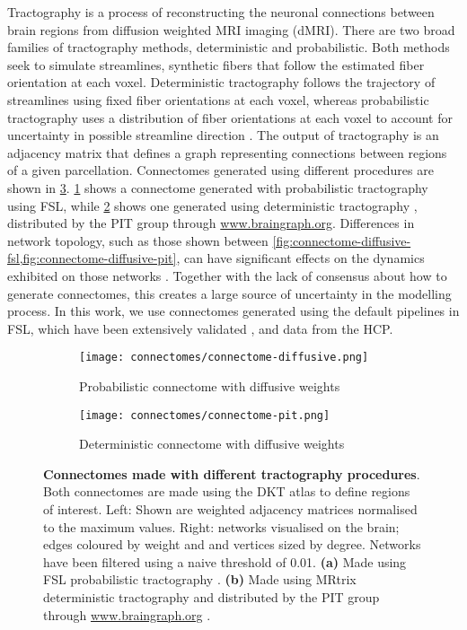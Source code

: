 Tractography is a process of reconstructing the neuronal connections between
brain regions from diffusion weighted MRI imaging (dMRI). There are two broad
families of tractography methods, deterministic and probabilistic. Both methods
seek to simulate streamlines, synthetic fibers that follow the estimated fiber
orientation at each voxel. Deterministic tractography follows the trajectory of
streamlines using fixed fiber orientations at each voxel, whereas probabilistic
tractography uses a distribution of fiber orientations at each voxel to account
for uncertainty in possible streamline direction \cite{sarwar2019mapping}. The
output of tractography is an adjacency matrix that defines a graph representing
connections between regions of a given parcellation. Connectomes generated using
different procedures are shown in \cref{fig:connectome}.
\cref{fig:connectome-diffusive-fsl} shows a connectome generated with
probabilistic tractography using FSL, while \cref{fig:connectome-diffusive-pit}
shows one generated using deterministic tractography
\cite{szalkai2017parameterizable,kerepesi2017braingraph}, distributed by the PIT
group through \url{www.braingraph.org}. Differences in network topology, such as
those shown between
\cref{fig:connectome-diffusive-fsl,fig:connectome-diffusive-pit}, can have
significant effects on the dynamics exhibited on those networks
\cite{putra2021braiding}. Together with the lack of consensus about how to
generate connectomes, this creates a large source of uncertainty in the
modelling process. In this work, we use connectomes generated using the default
pipelines in FSL, which have been extensively validated
\cite{behrens2003characterization,behrens2007probabilistic,warrington2020xtract},
and data from the HCP.
\begin{figure}[t]
    \centering
    \begin{subfigure}[b]{0.8\textwidth}
        \centering
        \texttt{[image: connectomes/connectome-diffusive.png]}
        \caption{Probabilistic connectome with diffusive weights}
        \label{fig:connectome-diffusive-fsl}
    \end{subfigure}
    \begin{subfigure}[b]{0.8\textwidth}
        \centering
        \texttt{[image: connectomes/connectome-pit.png]}
        \caption{Deterministic connectome with diffusive weights}
        \label{fig:connectome-diffusive-pit}
    \end{subfigure}
    \caption{\textbf{Connectomes made with different tractography procedures}.\\
    Both connectomes are made using the DKT atlas to define regions of interest.
    Left: Shown are weighted adjacency matrices normalised to the maximum
    values. Right: networks visualised on the brain; edges coloured by weight
    and and vertices sized by degree. Networks have been filtered using a naive
    threshold of 0.01. \textbf{(a)} Made using FSL probabilistic tractography
    \cite{behrens2003characterization,behrens2007probabilistic}. \textbf{(b)}
    Made using MRtrix deterministic tractography and distributed by the PIT
    group through \url{www.braingraph.org} \cite{kerepesi2017braingraph}.}
       \label{fig:connectome}
\end{figure}

